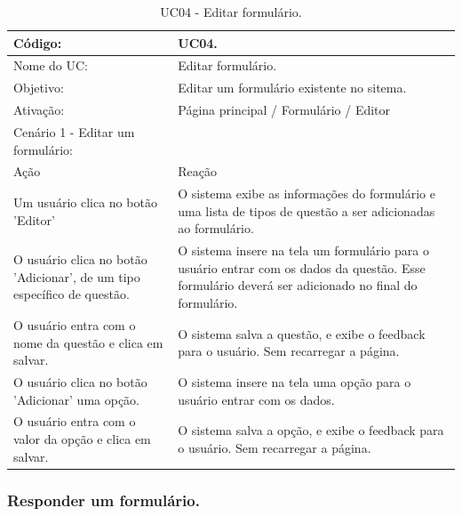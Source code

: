 \documentclass[11pt]{article}
\begin{document}
        \begin{table}[h]
          \begin{center}
            \begin{tabular}{ | p{7cm} | p{8cm} | }
              \hline
              Código: \cellcolor{gray} & UC04. \\
              \hline
              Nome do UC: \cellcolor{gray} & Editar formulário. \\
              \hline
              Objetivo: \cellcolor{gray} & Editar um formulário existente no sitema. \\
              \hline
              Ativação: \cellcolor{gray} & Página principal / Formulário / Editor \\
              \hline
              \hline
              Cenário 1 - Editar um formulário: &  \\
              \hline
              Ação\cellcolor{gray} & Reação\cellcolor{gray} \\
              \hline
              Um usuário clica no botão 'Editor' & O sistema exibe as informações do formulário e uma lista de tipos de questão a ser adicionadas ao formulário. \\
              \hline
              O usuário clica no botão 'Adicionar', de um tipo específico de questão. & O sistema insere na tela um formulário para o usuário entrar com os dados da questão. Esse formulário deverá ser adicionado no final do formulário. \\
              \hline
              O usuário entra com o nome da questão e clica em salvar. & O sistema salva a questão, e exibe o feedback para o usuário. Sem recarregar a página. \\
              \hline
              O usuário clica no botão 'Adicionar' uma opção. & O sistema insere na tela uma opção para o usuário entrar com os dados. \\
              \hline
              O usuário entra com o valor da opção e clica em salvar. & O sistema salva a opção, e exibe o feedback para o usuário. Sem recarregar a página. \\
              \hline
            \end{tabular}
            \caption{UC04 - Editar formulário.}
          \end{center}
        \end{table}

    \clearpage
      
      \subsubsection{Responder um formulário.}
\end{document}
